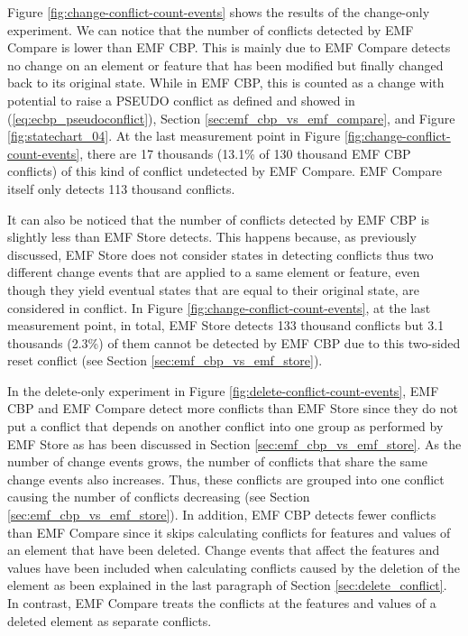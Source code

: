Figure \ref{fig:change-conflict-count-events} shows the results of the change-only experiment. We can notice that the number of conflicts detected by EMF Compare is lower than EMF CBP. This is mainly due to EMF Compare detects no change on an element or feature that has been modified but finally changed back to its original state. While in EMF CBP, this is counted as a change with potential to raise a {PSEUDO} conflict as defined and showed in (\ref{eq:ecbp_pseudoconflict}), Section \ref{sec:emf_cbp_vs_emf_compare}, and Figure \ref{fig:statechart_04}. At the last measurement point in Figure \ref{fig:change-conflict-count-events}, there are 17 thousands (13.1\% of 130 thousand EMF CBP conflicts) of this kind of conflict undetected by EMF Compare. EMF Compare itself only detects 113 thousand conflicts. 

It can also be noticed that the number of conflicts detected by EMF CBP is slightly less than EMF Store detects. This happens because, as previously discussed, EMF Store does not consider states in detecting conflicts thus two different change events that are applied to a same element or feature, even though they yield eventual states that are equal to their original state, are considered in conflict. In Figure \ref{fig:change-conflict-count-events}, at the last measurement point, in total, EMF Store detects 133 thousand conflicts but 3.1 thousands (2.3\%) of them cannot be detected by EMF CBP due to this two-sided reset conflict (see Section \ref{sec:emf_cbp_vs_emf_store}). 

In the delete-only experiment in Figure \ref{fig:delete-conflict-count-events}, EMF CBP and EMF Compare detect more conflicts than EMF Store since they do not put a conflict that depends on another conflict into one group as performed by EMF Store as has been discussed in Section \ref{sec:emf_cbp_vs_emf_store}. As the number of change events grows, the number of conflicts that share the same change events also increases. Thus, these conflicts are grouped into one conflict causing the number of conflicts decreasing (see Section \ref{sec:emf_cbp_vs_emf_store}). In addition, EMF CBP detects fewer conflicts than EMF Compare since it skips calculating conflicts for features and values of an element that have been deleted. Change events that affect the features and values have been included when calculating conflicts caused by the deletion of the element as been explained in the last paragraph of Section \ref{sec:delete_conflict}. In contrast, EMF Compare treats the conflicts at the features and values of a deleted element as separate conflicts. 

